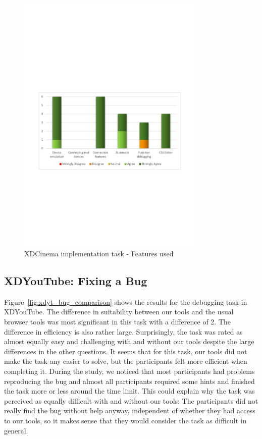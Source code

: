 \begin{figure}[H]
  \centering
    \includegraphics[width=0.8\textwidth]{images/charts/xdc_impl_features_used.pdf}
	\caption[xdc-impl: Features used]{XDCinema implementation task - Features used}
	\label{fig:xdc_impl_features_used}
\end{figure}

\subsection{XDYouTube: Fixing a Bug}

Figure~\ref{fig:xdyt_bug_comparison} shows the results for the debugging task in XDYouTube. The difference in suitability between our tools and the usual browser tools was most significant in this task with a difference of 2. The difference in efficiency is also rather large. Surprisingly, the task was rated as almost equally easy and challenging with and without our tools despite the large differences in the other questions. It seems that for this task, our tools did not make the task any easier to solve, but the participants felt more efficient when completing it. During the study, we noticed that most participants had problems reproducing the bug and almost all participants required some hints and finished the task more or less around the time limit. This could explain why the task was perceived as equally difficult with and without our tools: The participants did not really find the bug without help anyway, independent of whether they had access to our tools, so it makes sense that they would consider the task as difficult in general. 

